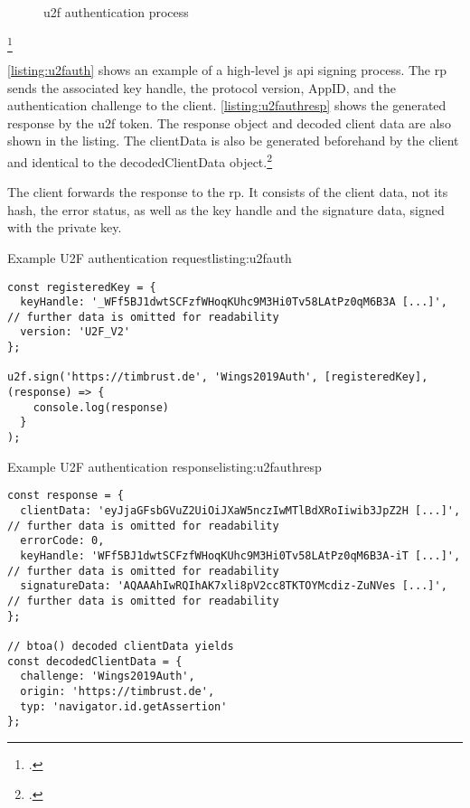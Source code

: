 \begin{figure}[hbt]
	\centering
	
	\caption[\gls{u2f} authentication process]{\gls{u2f} authentication process\footnotemark}
	\label{fig:u2f_auth}
\end{figure}
\footcitetexts[Source: diagram by author, based on][70]{10.1007/978-3-319-75650-9_5}[][428]{10.1007/978-3-662-54970-4_25}

\autoref{listing:u2fauth} shows an example of a high-level \gls{js} \gls{api} signing process. The \gls{rp} sends the associated key handle, the protocol version, AppID, and the authentication challenge to the client. \autoref{listing:u2fauthresp} shows the generated response by the \gls{u2f} token. The response object and decoded client data are also shown in the listing. The clientData is also be generated beforehand by the client and identical to the decodedClientData object.\footcites[See][3]{u2f-js-api}

The client forwards the response to the \gls{rp}. It consists of the client data, not its hash, the error status, as well as the key handle and the signature data, signed with the private key. 

\begin{example}{Example U2F authentication request}{listing:u2fauth}
\begin{verbatim}
const registeredKey = {
  keyHandle: '_WFf5BJ1dwtSCFzfWHoqKUhc9M3Hi0Tv58LAtPz0qM6B3A [...]', // further data is omitted for readability
  version: 'U2F_V2'
};

u2f.sign('https://timbrust.de', 'Wings2019Auth', [registeredKey], (response) => {
    console.log(response)
  }
);
\end{verbatim}
\end{example}

\begin{example}{Example U2F authentication response}{listing:u2fauthresp}
\begin{verbatim}
const response = {
  clientData: 'eyJjaGFsbGVuZ2UiOiJXaW5nczIwMTlBdXRoIiwib3JpZ2H [...]', // further data is omitted for readability
  errorCode: 0,
  keyHandle: 'WFf5BJ1dwtSCFzfWHoqKUhc9M3Hi0Tv58LAtPz0qM6B3A-iT [...]', // further data is omitted for readability
  signatureData: 'AQAAAhIwRQIhAK7xli8pV2cc8TKTOYMcdiz-ZuNVes [...]', // further data is omitted for readability
};

// btoa() decoded clientData yields
const decodedClientData = {
  challenge: 'Wings2019Auth',
  origin: 'https://timbrust.de',
  typ: 'navigator.id.getAssertion'
};
\end{verbatim}
\end{example}
